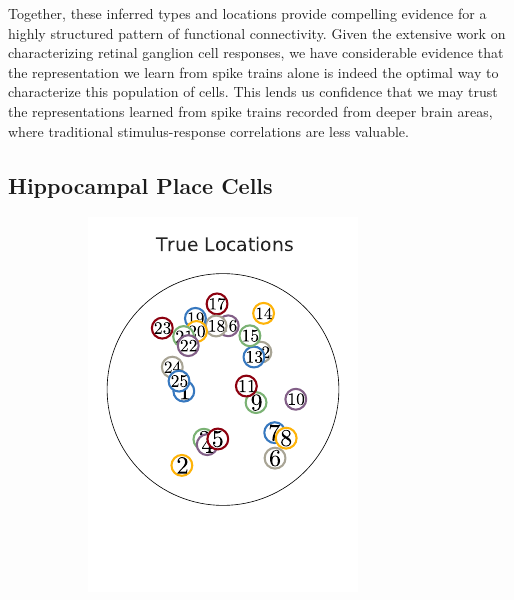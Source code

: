 Together, these inferred types and locations provide 
compelling evidence for a highly structured pattern of functional 
connectivity. Given the extensive work on characterizing retinal 
ganglion cell responses, we have considerable evidence that the 
representation we learn from spike trains alone is indeed the 
optimal way to characterize this population of cells. This 
lends us confidence that we may trust the representations learned from 
spike trains recorded from deeper brain areas, where traditional 
stimulus-response correlations are less valuable.

\subsection{Hippocampal Place Cells}
\label{sec:hipp}

\begin{figure}[t!]
  \centering
  \vspace{-.2in}
  \begin{subfigure}[b]{1.75in}
    \centering
    \caption{}
    \vspace{-.2in}
    \includegraphics[width=\textwidth]{figures/ch3/hipp_true_locations.pdf}

\end{subfigure}
\end{figure}
